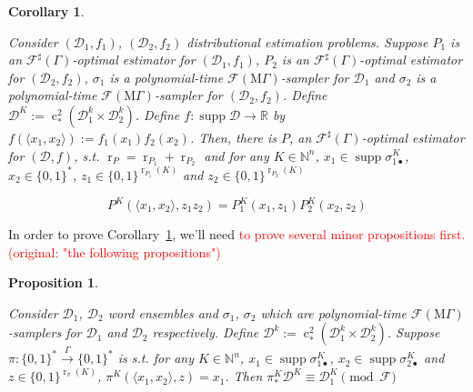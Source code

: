 \documentclass[11pt]{article}
\numberwithin{equation}{section}
\theoremstyle{definition}
\theoremstyle{plain}
\newtheorem{proposition}{Proposition}[section]
\newtheorem{corollary}{Corollary}[section]
\newcommand{\Bool}{\{0,1\}}
\newcommand{\Words}{{\Bool^*}}
\newcommand{\WordsLen}[1]{{\Bool^{#1}}}
\DeclareMathOperator{\Supp}{supp}
\DeclareMathOperator{\R}{r}
\DeclareMathOperator{\En}{c}
\newcommand{\Nats}{\mathbb{N}}
\newcommand{\Reals}{\mathbb{R}}
\newcommand{\Chev}[1]{\langle #1 \rangle}
\newcommand{\Dist}{\mathcal{D}}
\newcommand{\MGrow}{\mathrm{M}\Gamma}
\newcommand{\Fall}{\mathcal{F}}
\newcommand{\ESG}{\Fall^\sharp(\Gamma)}
\newcommand{\EMG}{\Fall(\MGrow)}
\newcommand{\Scheme}{\xrightarrow{\Gamma}}
\begin{document}
\begin{samepage}
\begin{corollary}
\label{crl:dir_prod}

Consider $(\Dist_1,f_1)$, $(\Dist_2,f_2)$ distributional estimation problems. Suppose $P_1$ is an $\ESG$-optimal estimator for $(\Dist_1,f_1)$, $P_2$ is an $\ESG$-optimal estimator for $(\Dist_2,f_2)$, $\sigma_1$ is a polynomial-time $\EMG$-sampler for $\Dist_1$ and $\sigma_2$ is a polynomial-time $\EMG$-sampler for $(\Dist_2,f_2)$. Define\\ ${\Dist^{K}:=\En_*^2(\Dist_1^k \times \Dist_2^k)}$. Define ${f: \Supp \Dist \rightarrow \Reals}$ by ${f(\Chev{x_1,x_2}):=f_1(x_1)f_2(x_2)}$. Then, there is $P$, an $\ESG$-optimal estimator for $(\Dist,f)$, s.t. $\R_P=\R_{P_1}+\R_{P_2}$ and for any $K \in \Nats^n$, $x_1 \in \Supp \sigma_{1\bullet}^{K}$, $x_2 \in \Words$, $z_1 \in \WordsLen{\R_{P_1}(K)}$ and $z_2 \in \WordsLen{\R_{P_2}(K)}$

\begin{equation}
P^{K}(\Chev{x_1,x_2}, z_1 z_2)=P_1^{K}(x_1,z_1) P_2^{K}(x_2,z_2)
\end{equation}

\end{corollary}
\end{samepage}

In order to prove Corollary~\ref{crl:dir_prod}, we'll need \textcolor{red}{to prove several minor propositions first. (original: "the following propositions")}

\begin{samepage}
\begin{proposition}
\label{prp:thm__mult__cond1}

Consider $\Dist_1$, $\Dist_2$ word ensembles and $\sigma_1$, $\sigma_2$ which are polynomial-time $\EMG$-samplers for $\Dist_1$ and $\Dist_2$ respectively. Define ${\Dist^k:=\En_*^2(\Dist_1^k \times \Dist_2^k)}$. Suppose $\pi: \Words \Scheme \Words$ is s.t. for any $K \in \Nats^n$, $x_1 \in \Supp \sigma_{1\bullet}^{K}$, ${x_2 \in \Supp \sigma_{2\bullet}^{K}}$ and $z \in \Bool^{\R_\pi(K)}$, $\pi^{K}(\Chev{x_1,x_2},z)=x_1$. Then $\pi_*^K\Dist^{K} \equiv \Dist_1^{K} \pmod \Fall$

\end{proposition}
\end{samepage}
\end{document}
